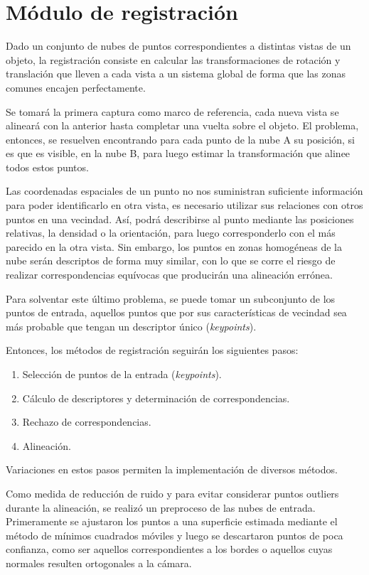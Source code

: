 \chapter{Módulo de registración}
	Dado un conjunto de nubes de puntos correspondientes a distintas vistas de
	un objeto, la registración consiste en calcular las transformaciones de
	rotación y translación que lleven a cada vista a un sistema global de forma
	que las zonas comunes encajen perfectamente.

	Se tomará la primera captura como marco de referencia, cada nueva vista se
	alineará con la anterior hasta completar una vuelta sobre el objeto.
	El problema, entonces, se resuelven encontrando para cada punto de la nube
	A su posición, si es que es visible, en la nube B, para luego estimar la
	transformación que alinee todos estos puntos.

	Las coordenadas espaciales de un punto no nos suministran suficiente
	información para poder identificarlo en otra vista, es necesario utilizar
	sus relaciones con otros puntos en una vecindad.
	Así, podrá describirse al punto mediante las posiciones relativas, la
	densidad o la orientación, para luego corresponderlo con el más parecido en
	la otra vista.
	Sin embargo, los puntos en zonas homogéneas de la nube serán descriptos de
	forma muy similar, con lo que se corre el riesgo de realizar
	correspondencias equívocas que producirán una alineación errónea.

	Para solventar este último problema, se puede tomar un subconjunto de los
	puntos de entrada, aquellos puntos que por sus características de vecindad
	sea más probable que tengan un descriptor único (\emph{keypoints}).

	Entonces, los métodos de registración seguirán los siguientes pasos:
	\begin{enumerate}
		\item Selección de puntos de la entrada (\emph{keypoints}).
		\item Cálculo de descriptores y determinación de correspondencias.
		\item Rechazo de correspondencias.
		\item Alineación.
	\end{enumerate}
	Variaciones en estos pasos permiten la implementación de diversos métodos.

	Como medida de reducción de ruido y para evitar considerar puntos outliers
	durante la alineación, se realizó un preproceso de las nubes de entrada.
	Primeramente se ajustaron los puntos a una superficie estimada mediante el
	método de mínimos cuadrados móviles y luego se descartaron puntos de poca
	confianza, como ser aquellos correspondientes a los bordes o aquellos cuyas
	normales resulten ortogonales a la cámara.

